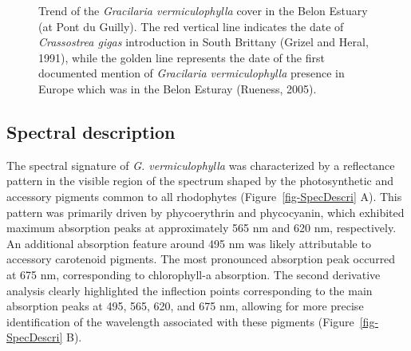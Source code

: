 \documentclass[
  letterpaper,
  11pt,
  english,
  singlespacing,
  headsepline]{MastersDoctoralThesis}
\begin{document}
\begin{spacing}{1.5}
\begin{figure}
{}

\caption{\label{fig-HistoricalPlot_g}Trend of the \emph{Gracilaria
vermiculophylla} cover in the Belon Estuary (at Pont du Guilly). The red
vertical line indicates the date of \emph{Crassostrea gigas}
introduction in South Brittany (Grizel and Heral, 1991), while the
golden line represents the date of the first documented mention of
\emph{Gracilaria vermiculophylla} presence in Europe which was in the
Belon Esturay (Rueness, 2005).}

\end{figure}%

\subsection{Spectral description}\label{spectral-description}

The spectral signature of \emph{G. vermiculophylla} was characterized by
a reflectance pattern in the visible region of the spectrum shaped by
the photosynthetic and accessory pigments common to all rhodophytes
(Figure~\ref{fig-SpecDescri} A). This pattern was primarily driven by
phycoerythrin and phycocyanin, which exhibited maximum absorption peaks
at approximately 565 nm and 620 nm, respectively. An additional
absorption feature around 495 nm was likely attributable to accessory
carotenoid pigments. The most pronounced absorption peak occurred at 675
nm, corresponding to chlorophyll-a absorption. The second derivative
analysis clearly highlighted the inflection points corresponding to the
main absorption peaks at 495, 565, 620, and 675 nm, allowing for more
precise identification of the wavelength associated with these pigments
(Figure~\ref{fig-SpecDescri} B).

\begin{figure}

\centering{

}
\end{figure}
\end{spacing}
\end{document}
